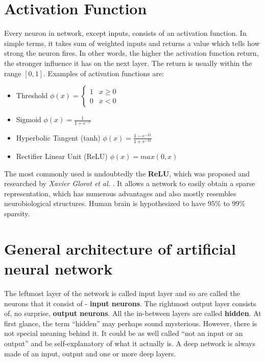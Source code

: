 \section{Activation Function}
\label{sec:activation-function}

Every neuron in network, except inputs, consists of an activation function. In simple terms, it takes sum of weighted inputs and returns a value which tells how strong the neuron fires. In other words, the higher the activation function return, the stronger influence it has on the next layer. The return is usually within the range $[0, 1]$. Examples of activation functions are: 
\begin{itemize}
    \item Threshold \hspace{5pt}
        $\phi(x) = 
        \begin{cases}
            1 & x \ge 0 \\
            0 & x<0
        \end{cases}$
    \item Sigmoid \hspace{5pt}
        $\phi(x) = \frac{1}{1+e^{-x}}$
    \item Hyperbolic Tangent (tanh) \hspace{5pt}
        $\phi(x) = \frac{1-e^{-2x}}{1+e^{-2x}}$
    \item Rectifier Linear Unit (ReLU) \hspace{5pt}
        $\phi(x) = max(0, x)$
\end{itemize}

The most commonly used is undoubtedly the \textbf{ReLU}, which was proposed and researched by \emph{Xavier Glorot et al.} \cite{DeepSparseReNN}. It allows a network to easily obtain a sparse representation, which has numerous advantages and also mostly resembles neurobiological structures. Human brain is hypothesized to have 95\% to 99\% sparsity.

\section{General architecture of artificial neural network}
\label{sec:general-architecture-ann}

The leftmost layer of the network is called input layer and so are called the neurons that it consist of - \textbf{input neurons}. The rightmost output layer consists of, no surprise, \textbf{output neurons}. All the in-between layers are called \textbf{hidden}. At first glance, the term ``hidden'' may perhaps sound mysterious. However, there is not special meaning behind it. It could be as well called ``not an input or an output'' and be self-explanatory of what it actually is. A deep network is always made of an input, output and one or more deep layers.


